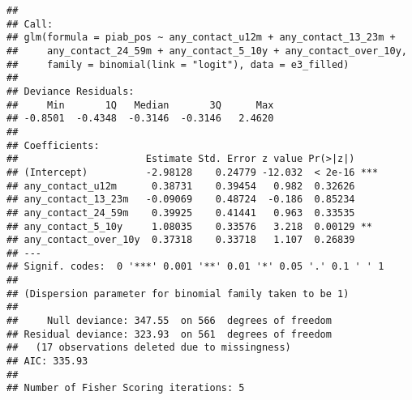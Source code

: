 \documentclass[
]{article}
\begin{document}
\begin{verbatim}
## 
## Call:
## glm(formula = piab_pos ~ any_contact_u12m + any_contact_13_23m + 
##     any_contact_24_59m + any_contact_5_10y + any_contact_over_10y, 
##     family = binomial(link = "logit"), data = e3_filled)
## 
## Deviance Residuals: 
##     Min       1Q   Median       3Q      Max  
## -0.8501  -0.4348  -0.3146  -0.3146   2.4620  
## 
## Coefficients:
##                      Estimate Std. Error z value Pr(>|z|)    
## (Intercept)          -2.98128    0.24779 -12.032  < 2e-16 ***
## any_contact_u12m      0.38731    0.39454   0.982  0.32626    
## any_contact_13_23m   -0.09069    0.48724  -0.186  0.85234    
## any_contact_24_59m    0.39925    0.41441   0.963  0.33535    
## any_contact_5_10y     1.08035    0.33576   3.218  0.00129 ** 
## any_contact_over_10y  0.37318    0.33718   1.107  0.26839    
## ---
## Signif. codes:  0 '***' 0.001 '**' 0.01 '*' 0.05 '.' 0.1 ' ' 1
## 
## (Dispersion parameter for binomial family taken to be 1)
## 
##     Null deviance: 347.55  on 566  degrees of freedom
## Residual deviance: 323.93  on 561  degrees of freedom
##   (17 observations deleted due to missingness)
## AIC: 335.93
## 
## Number of Fisher Scoring iterations: 5
\end{verbatim}
\end{document}
